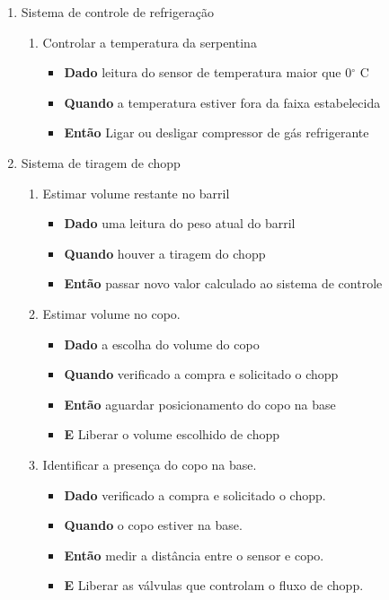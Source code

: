 		\begin{enumerate}
			\item Sistema de controle de refrigeração
				\begin{enumerate}
					\item Controlar a temperatura da serpentina
						\begin{itemize}
							\item \textbf{Dado} leitura do sensor de temperatura maior que 0$^{\circ}$ C
							\item \textbf{Quando} a temperatura estiver fora da faixa estabelecida
							\item \textbf{Então} Ligar ou desligar compressor de gás refrigerante
						\end{itemize}
				\end{enumerate}

				\item Sistema de tiragem de chopp
				\begin{enumerate}
					\item Estimar volume restante no barril
						\begin{itemize}
							\item \textbf{Dado} uma leitura do  peso atual do barril
							\item \textbf{Quando} houver a tiragem do chopp
							\item \textbf{Então} passar novo valor calculado ao sistema de controle
						\end{itemize}

				\item Estimar volume no  copo.
						\begin{itemize}
							\item \textbf{Dado} a escolha do volume do copo
							\item \textbf{Quando} verificado a compra e solicitado o chopp
							\item \textbf{Então} aguardar posicionamento do copo na base
							\item \textbf{E} Liberar o  volume escolhido de chopp
						\end{itemize}

				\item Identificar a presença do copo na base.
						\begin{itemize}
							\item \textbf{Dado} verificado a compra e solicitado o chopp.
							\item \textbf{Quando} o copo estiver na base.
							\item \textbf{Então} medir a distância entre o sensor e copo.
							\item \textbf{E} Liberar as válvulas que controlam o fluxo de chopp.
						\end{itemize}


\end{enumerate}
\end{enumerate}
